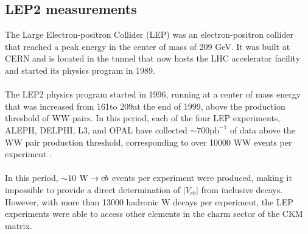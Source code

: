 \subsection{LEP2 measurements}
The Large Electron-positron Collider (LEP) was an electron-positron collider that reached a peak energy in the center of mass of 209 GeV. It was built at CERN and is located in the tunnel that now hosts the LHC accelerator facility and started its physics program in 1989.\\
\\
The LEP2 physics program started in 1996, running at a center of mass energy  that was increased from 161\GeV to 209\GeV at the end of 1999, above the production threshold of WW pairs. 
In this period, each of the four LEP experiments, ALEPH, DELPHI, L3, and OPAL have collected  $\sim700 \text{pb}^{-1}$ of data above the WW pair production threshold, corresponding to over 10000 WW events per experiment \cite{Lu2008WLEP}.\\
\\
In this period, $\sim 10$ ${\text{W}} \to cb$ events per experiment were produced, making it impossible to provide a direct determination of $|V_{cb}|$ from inclusive \PW decays.\\
However, with more than 13000 hadronic W decays per experiment, the LEP experiments were able to access other elements in the charm sector of the CKM matrix.


